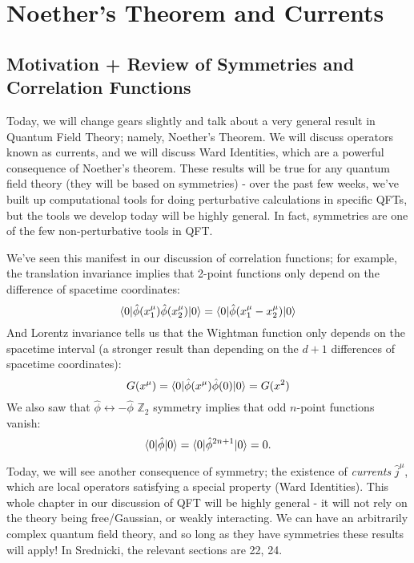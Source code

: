 \section{Noether's Theorem and Currents}

\subsection{Motivation + Review of Symmetries and Correlation Functions}
Today, we will change gears slightly and talk about a very general result in Quantum Field Theory; namely, Noether's Theorem. We will discuss operators known as currents, and we will discuss Ward Identities, which are a powerful consequence of Noether's theorem. These results will be true for any quantum field theory (they will be based on symmetries) - over the past few weeks, we've built up computational tools for doing perturbative calculations in specific QFTs, but the tools we develop today will be highly general. In fact, symmetries are one of the few non-perturbative tools in QFT.

We've seen this manifest in our discussion of correlation functions; for example, the translation invariance implies that 2-point functions only depend on the difference of spacetime coordinates:
\begin{equation}
    \langle 0 \rvert\hat{\phi}(x^\mu_1)\hat{\phi}(x^\mu_2)\lvert 0 \rangle = \langle 0 \rvert\hat{\phi}(x^\mu_1 - x^\mu_2)\lvert 0 \rangle
\end{equation}
And Lorentz invariance tells us that the Wightman function only depends on the spacetime interval (a stronger result than depending on the $d+1$ differences of spacetime coordinates):
\begin{equation}
    G(x^\mu) = \langle 0 \rvert\hat{\phi}(x^\mu)\hat{\phi}(0)\lvert 0 \rangle = G(x^2)
\end{equation}
We also saw that $\hat{\phi} \leftrightarrow -\hat{\phi}$ $\mathbb{Z}_2$ symmetry implies that odd $n$-point functions vanish:
\begin{equation}
    \langle 0 \rvert\hat{\phi}\lvert 0 \rangle = \langle 0 \rvert\hat{\phi}^{2n+1}\lvert 0 \rangle = 0.
\end{equation}

Today, we will see another consequence of symmetry; the existence of \emph{currents} $\hat{j}^\mu$, which are local operators satisfying a special property (Ward Identities). This whole chapter in our discussion of QFT will be highly general - it will not rely on the theory being free/Gaussian, or weakly interacting. We can have an arbitrarily complex quantum field theory, and so long as they have symmetries these results will apply! In Srednicki, the relevant sections are 22, 24.

